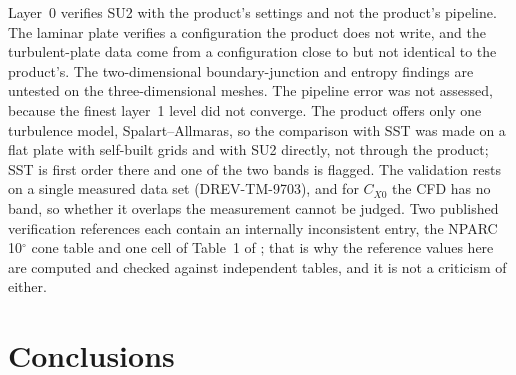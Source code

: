 \documentclass[twocolumn]{labreport}
\newcommand{\CXzero}{C_{X0}}
\begin{document}
Layer~0 verifies SU2 with the product's settings and not the product's pipeline.
The laminar plate verifies a configuration the product does not write, and the turbulent-plate data come from a configuration close to but not identical to the product's.
The two-dimensional boundary-junction and entropy findings are untested on the three-dimensional meshes.
The pipeline error was not assessed, because the finest layer~1 level did not converge.
The product offers only one turbulence model, Spalart--Allmaras, so the comparison with SST was made on a flat plate with self-built grids and with SU2 directly, not through the product; SST is first order there and one of the two bands is flagged.
The validation rests on a single measured data set (DREV-TM-9703), and for $\CXzero$ the CFD has no band, so whether it overlaps the measurement cannot be judged.
Two published verification references each contain an internally inconsistent entry, the NPARC 10$^\circ$ cone table and one cell of Table~1 of \citet{celik2008}; that is why the reference values here are computed and checked against independent tables, and it is not a criticism of either.

\section{Conclusions}
\label{sec:conclusions}
\end{document}
